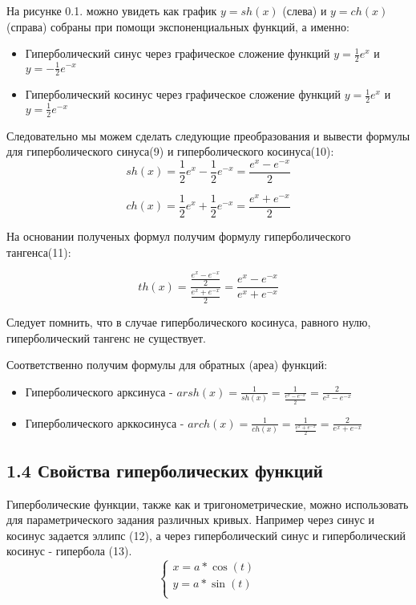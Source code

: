 
На рисунке 0.1. можно увидеть как график $y = sh(x)$ (слева) и $y=ch(x)$ (справа) собраны при помощи экспоненциальных функций, а именно:

\begin{itemize}
    \item Гиперболический синус через графическое сложение функций $y=\frac{1}{2}e^x$ и $y=-\frac{1}{2}e^{-x}$
    \item Гиперболический косинус через графическое сложение функций $y=\frac{1}{2}e^x$ и $y=\frac{1}{2}e^{-x}$
\end{itemize}

Следовательно мы можем сделать следующие преобразования и вывести формулы для гиперболического синуса(9) и гиперболического косинуса(10):
\begin{equation}
    sh(x) = \frac{1}{2}e^x - \frac{1}{2}e^{-x} = \frac{e^x-e^{-x}}{2}
 \end{equation}

 \begin{equation}
    ch(x) = \frac{1}{2}e^x + \frac{1}{2}e^{-x} = \frac{e^x+e^{-x}}{2}
 \end{equation}

 На основании полученых формул получим формулу гиперболического тангенса(11):

 \begin{equation}
    th(x) = \frac{\frac{e^x-e^{-x}}{2}}{\frac{e^x+e^{-x}}{2}} = \frac{e^x-e^{-x}}{e^x+e^{-x}}
 \end{equation}

Следует помнить, что в случае гиперболического косинуса, равного нулю, гиперболический тангенс не существует.

Соответственно получим формулы для обратных (ареа) функций:

\begin{itemize}
    \item Гиперболического арксинуса - $arsh(x) = \frac{1}{sh(x)} = \frac{1}{\frac{e^x-e^{-x}}{2}} = \frac{2}{e^x-e^{-x}}$
    \item Гиперболического арккосинуса - $arch(x) = \frac{1}{ch(x)} = \frac{1}{\frac{e^x+e^{-x}}{2}} = \frac{2}{e^x+e^{-x}}$
\end{itemize}
\subsection*{1.4 Свойства гиперболических функций}
Гиперболические функции, также как и тригонометрические, можно использовать для параметрического задания различных кривых. Например через синус и косинус задается эллипс (12), а через гиперболический синус и гиперболический косинус - гипербола (13).
\begin{equation}
    \begin{cases}
        x = a * \cos(t)\\
        y = a * \sin(t)\\
    \end{cases}
\end{equation}

